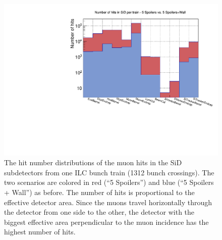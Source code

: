 \begin{figure}
    \centering
    \includegraphics[height=0.32\textheight]{figures/Hits_in_SiD_subdetectors_MuonSpoilerStudy.pdf}
    \caption[Hit number distribution in the SiD subdetectors]{
    The hit number distributions of the muon hits in the SiD subdetectors from one ILC bunch train (1312 bunch crossings).
    The two scenarios are colored in red (``5 Spoilers'') and blue (``5 Spoilers + Wall'') as before.
    The number of hits is proportional to the effective detector area.
    Since the muons travel horizontally through the detector from one side to the other, the detector with the biggest effective area perpendicular to the muon incidence has the highest number of hits.
    }
    \label{fig:hit_distribution}
\end{figure}

